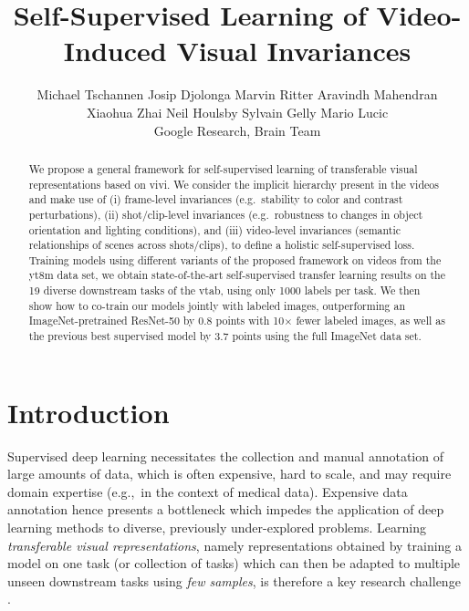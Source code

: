 \documentclass[10pt,twocolumn,letterpaper]{article}
\begin{document}
\title{Self-Supervised Learning of Video-Induced Visual Invariances}


\author{Michael Tschannen \quad Josip Djolonga \quad Marvin Ritter \quad Aravindh Mahendran \\
Xiaohua Zhai \quad Neil Houlsby \quad Sylvain Gelly \quad Mario Lucic \\[0.2cm]
Google Research, Brain Team\vspace{-0.1cm}}

\maketitle
\thispagestyle{empty}
\begin{abstract}
   We propose a general framework for self-supervised learning of transferable visual representations based on \gls{vivi}.
We consider the implicit hierarchy present in the videos and make use of (i) frame-level invariances (e.g.\ stability to color and contrast perturbations), (ii) shot/clip-level invariances (e.g.\ robustness to changes in object orientation and lighting conditions), and (iii) video-level invariances (semantic relationships of scenes across shots/clips), to define a holistic self-supervised loss. Training models using different variants of the proposed framework on videos from the \gls{yt8m} data set, we obtain state-of-the-art self-supervised transfer learning results on the 19 diverse downstream tasks of the \gls{vtab}, using only 1000 labels per task. We then show how to co-train our models jointly with labeled images, outperforming an ImageNet-pretrained ResNet-50 by 0.8 points with 10$\times$ fewer labeled images, as well as the previous best supervised model by 3.7 points using the full ImageNet data set.
\end{abstract}


\section{Introduction}
Supervised deep learning necessitates the collection and manual annotation of large amounts of data, which is often expensive, hard to scale, and may require domain expertise (e.g.,\ in the context of medical data). Expensive data annotation hence presents a bottleneck which impedes the application of deep learning methods to diverse, previously under-explored problems.
Learning \emph{transferable visual representations}, namely representations obtained by training a model on one task (or collection of tasks) which can then be adapted to multiple unseen downstream tasks using \emph{few samples}, is therefore a key research challenge \cite{zhai2019visual}.
\end{document}
